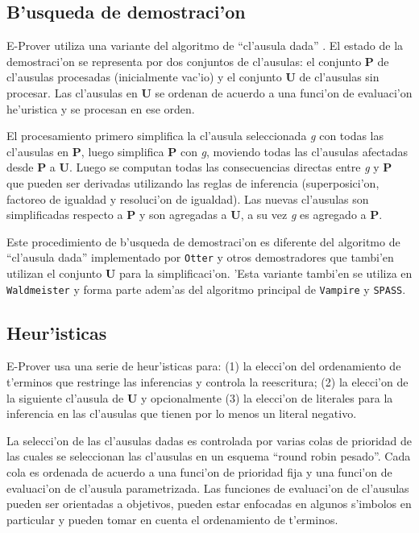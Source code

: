 \subsection{B'usqueda de demostraci'on}

E-Prover utiliza una variante del algoritmo de ``cl'ausula dada'' \cite{dk97}. El estado de la demostraci'on se representa por dos conjuntos de cl'ausulas: el conjunto \textbf{P} de cl'ausulas procesadas (inicialmente vac'io) y el conjunto \textbf{U} de cl'ausulas sin procesar. Las cl'ausulas en \textbf{U} se ordenan de acuerdo a una funci'on de evaluaci'on he'uristica y se procesan en ese orden.

El procesamiento primero simplifica la cl'ausula seleccionada \textit{g} con todas las cl'ausulas en \textbf{P}, luego simplifica \textbf{P} con \textit{g}, moviendo todas las cl'ausulas afectadas desde \textbf{P} a \textbf{U}. Luego se computan todas las consecuencias directas entre \textit{g} y \textbf{P} que pueden ser derivadas utilizando las reglas de inferencia (superposici'on, factoreo de igualdad y resoluci'on de igualdad). Las nuevas cl'ausulas son simplificadas respecto a \textbf{P} y son agregadas a \textbf{U}, a su vez \textit{g} es agregado a \textbf{P}.

Este procedimiento de b'usqueda de demostraci'on es diferente del algoritmo de ``cl'ausula dada'' implementado por \texttt{Otter}\cite{otter} y otros demostradores que tambi'en utilizan el conjunto \textbf{U} para la simplificaci'on. 'Esta variante tambi'en se utiliza en \texttt{Waldmeister}\cite{BH96} y forma parte adem'as del algoritmo principal de \texttt{Vampire} \cite{vampire} y \texttt{SPASS}\cite{spass}.

\subsection{Heur'isticas}

E-Prover usa una serie de heur'isticas para: (1) la elecci'on del ordenamiento de t'erminos que restringe las inferencias y controla la reescritura; (2) la elecci'on de la siguiente cl'ausula de \textbf{U} y opcionalmente (3) la elecci'on de literales para la inferencia en las cl'ausulas que tienen por lo menos un literal negativo.

La selecci'on de las cl'ausulas dadas es controlada por varias colas de prioridad de las cuales se seleccionan las cl'ausulas en un esquema ``round robin pesado''. Cada cola es ordenada de acuerdo a una funci'on de prioridad fija y una funci'on de evaluaci'on de cl'ausula parametrizada. Las funciones de evaluaci'on de cl'ausulas pueden ser orientadas a objetivos, pueden estar enfocadas en algunos s'imbolos en particular y pueden tomar en cuenta el ordenamiento de t'erminos. 


